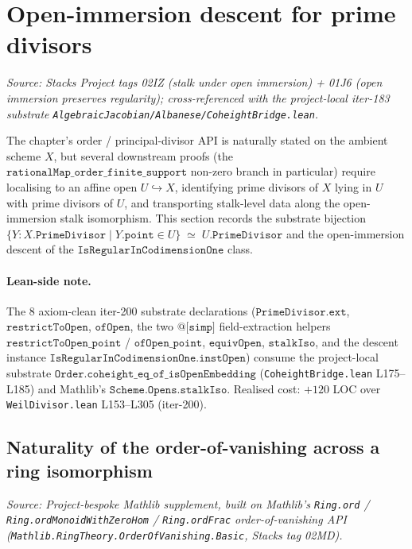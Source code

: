 \section{Open-immersion descent for prime divisors}
\label{sec:open_immersion_descent}
\textit{Source: Stacks Project tags 02IZ (stalk under open immersion) +
01J6 (open immersion preserves regularity); cross-referenced with the
project-local iter-183 substrate
\texttt{AlgebraicJacobian/Albanese/CoheightBridge.lean}.}

The chapter's order / principal-divisor API is naturally stated on the
ambient scheme \(X\), but several downstream proofs (the
\(\texttt{rationalMap\_order\_finite\_support}\) non-zero branch in
particular) require localising to an affine open \(U \hookrightarrow X\),
identifying prime divisors of \(X\) lying in \(U\) with prime divisors of
\(U\), and transporting stalk-level data along the open-immersion stalk
isomorphism. This section records the substrate bijection
\(\{Y : X.\texttt{PrimeDivisor} \mid Y.\texttt{point} \in U\}
 \;\simeq\; U.\texttt{PrimeDivisor}\)
and the open-immersion descent of the \(\texttt{IsRegularInCodimensionOne}\)
class.


\paragraph{Lean-side note.} The 8 axiom-clean iter-200 substrate
declarations
(\(\texttt{PrimeDivisor.ext}\), \(\texttt{restrictToOpen}\),
\(\texttt{ofOpen}\), the two \(\texttt{@[simp]}\) field-extraction
helpers \(\texttt{restrictToOpen\_point}\) /
\(\texttt{ofOpen\_point}\), \(\texttt{equivOpen}\),
\(\texttt{stalkIso}\), and the descent instance
\(\texttt{IsRegularInCodimensionOne.instOpen}\)) consume the project-local
substrate \(\texttt{Order.coheight\_eq\_of\_isOpenEmbedding}\)
(\texttt{CoheightBridge.lean} L175--L185) and Mathlib's
\(\texttt{Scheme.Opens.stalkIso}\). Realised cost: \(+120\) LOC over
\texttt{WeilDivisor.lean} L153--L305 (iter-200).

\subsection{Naturality of the order-of-vanishing across a ring isomorphism}
\label{subsec:ordFrac_ringEquiv}
\textit{Source: Project-bespoke Mathlib supplement, built on Mathlib's
\texttt{Ring.ord} / \texttt{Ring.ordMonoidWithZeroHom} / \texttt{Ring.ordFrac}
order-of-vanishing API (\texttt{Mathlib.RingTheory.OrderOfVanishing.Basic},
Stacks tag 02MD).}

